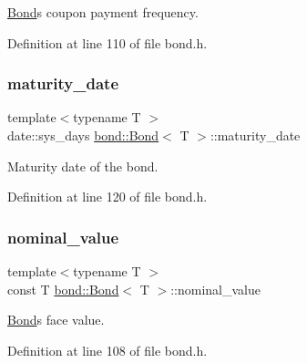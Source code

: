 \hyperlink{classbond_1_1_bond}{Bond}\textquotesingle{}s coupon payment frequency. 



Definition at line 110 of file bond.\+h.

\mbox{\label{classbond_1_1_bond_aba0bd9e2e1de7b9f05bb9c61b1fb9f1e}} 
\subsubsection{\texorpdfstring{maturity\+\_\+date}{maturity\_date}}
{\footnotesize\ttfamily template$<$typename T $>$ \\
date\+::sys\+\_\+days \hyperlink{classbond_1_1_bond}{bond\+::\+Bond}$<$ T $>$\+::maturity\+\_\+date\hspace{0.3cm}{\ttfamily [private]}}



Maturity date of the bond. 



Definition at line 120 of file bond.\+h.

\mbox{\label{classbond_1_1_bond_a7a79ca13c060697765f13140eb471b84}} 
\subsubsection{\texorpdfstring{nominal\+\_\+value}{nominal\_value}}
{\footnotesize\ttfamily template$<$typename T $>$ \\
const T \hyperlink{classbond_1_1_bond}{bond\+::\+Bond}$<$ T $>$\+::nominal\+\_\+value\hspace{0.3cm}{\ttfamily [private]}}



\hyperlink{classbond_1_1_bond}{Bond}\textquotesingle{}s face value. 



Definition at line 108 of file bond.\+h.

\mbox{\label{classbond_1_1_bond_afcabe8593aba44ca9740d14f85a39f2a}} 
